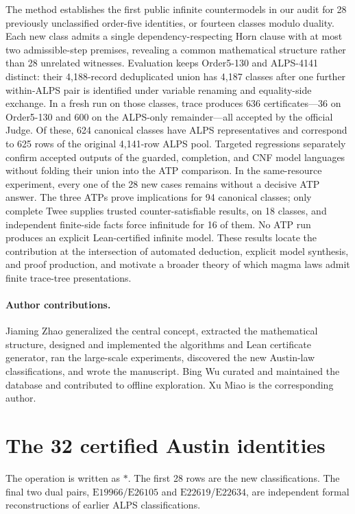 \documentclass[runningheads]{llncs}
\newcommand{\Law}[1]{\ensuremath{\mathrm{E}#1}}
\begin{document}
The method establishes the first public infinite countermodels in our audit
for 28 previously unclassified order-five identities, or fourteen classes
modulo duality.  Each new class admits a single dependency-respecting Horn
clause with at most two admissible-step premises, revealing a common
mathematical structure rather than 28 unrelated witnesses.  Evaluation keeps
Order5-130 and ALPS-4141 distinct: their 4,188-record deduplicated union has
4,187 classes after one further within-ALPS pair is identified under variable
renaming and equality-side exchange.  In a fresh
run on those classes, trace produces 636 certificates---36 on Order5-130 and
600 on the ALPS-only remainder---all accepted by the official Judge.  Of these,
624 canonical classes have ALPS representatives and correspond to 625 rows of
the original 4,141-row ALPS pool.  Targeted regressions separately confirm accepted outputs of the guarded,
completion, and CNF model languages without folding their union into the ATP
comparison.  In the same-resource experiment, every one of the 28 new cases
remains without a decisive ATP answer.  The three ATPs prove implications for
94 canonical classes; only complete Twee supplies trusted counter-satisfiable
results, on 18 classes, and independent finite-side facts force infinitude for
16 of them.  No ATP run produces an explicit Lean-certified infinite model.
These results
locate the contribution at the intersection of automated deduction, explicit
model synthesis, and proof production, and motivate a broader theory of which
magma laws admit finite trace-tree presentations.

\paragraph{Author contributions.}
Jiaming Zhao generalized the central concept, extracted the mathematical
structure, designed and implemented the algorithms and Lean certificate
generator, ran the large-scale experiments, discovered the new Austin-law
classifications, and wrote the manuscript.  Bing Wu curated and maintained
the database and contributed to offline exploration.  Xu Miao is the
corresponding author.

\appendix

\section{The 32 certified Austin identities}
\label{app:identities}

The operation is written as $\ast$.  The first 28 rows are the new
classifications.  The final two dual pairs,
\Law{19966}/\Law{26105} and \Law{22619}/\Law{22634}, are independent formal
reconstructions of earlier ALPS classifications.





\end{document}
